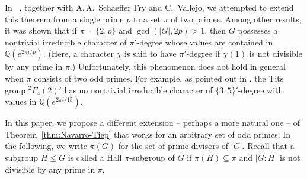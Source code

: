 \documentclass[12pt]{amsart}
\theoremstyle{definition}
\numberwithin{equation}{section}
\newcommand{\QQ}{{\mathbb Q}}
\begin{document}
In%
~\cite{GHSV21}, together with A.\,A.~Schaeffer Fry and C.~Vallejo,
we attempted to extend this theorem from a single prime $p$ to a set
$\pi$ of two primes. Among %
other results, it was shown that if
$\pi=\{2,p\}$ and $\gcd(|G|,2p)>1$, then $G$ possesses %
a nontrivial
irreducible character of $\pi'$-degree whose values are contained %
in
$\QQ(e^{2\pi i/p})$. (Here, %
a character $\chi$ is said to have
$\pi'$-degree if $\chi(1)$ is not divisible by any prime in $\pi$.)
Unfortunately, this phenomenon does not hold in general when $\pi$
consists of two odd primes. For example, as pointed out in
\cite[Proposition~4.1]{GHSV21}, the Tits group ${}^2F_4(2)'$ has no
nontrivial irreducible character of %
$\{3,5\}'$-degree with %
values in
$\QQ(e^{2\pi i/15})$.

In this paper, we propose a different extension -- perhaps a more
natural one -- of Theorem~\ref{thm:Navarro-Tiep} that works for
an arbitrary set of odd primes. In the following, we write $\pi(G)$
for the set of prime divisors of $|G|$. Recall that a subgroup $H\le
G$ is called %
a Hall $\pi$-subgroup of %
$G$ %
if $\pi(H)\subseteq \pi$
and $|G:H|$ is %
not divisible by any prime in $\pi$.
\end{document}
